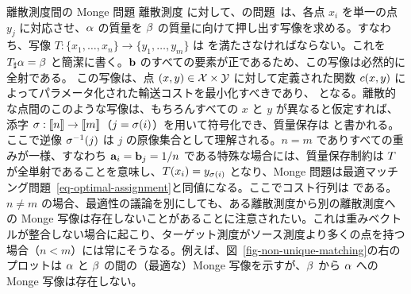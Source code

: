 \begin{rem1}{離散測度間の Monge 問題}\label{rem-monge1}
離散測度
に対して、\citeauthor{Monge1781}の問題~\citeyearpar{Monge1781}は、各点 $x_i$ を単一の点 $y_j$ に対応させ、$\alpha$ の質量を $\beta$ の質量に向けて押し出す写像を求める。すなわち、写像 $T:\{x_1,\dots, x_n\}\rightarrow \{y_1,\dots,y_m\}$ は
を満たさなければならない。これを $T_\sharp \alpha = \beta$ と簡潔に書く。$\mathrm{\textbf{b}}$ のすべての要素が正であるため、この写像は必然的に全射である。
%
この写像は、点 $(x,y) \in \mathcal{X} \times \mathcal{Y}$ に対して定義された関数 $c(x,y)$ によってパラメータ化された輸送コストを最小化すべきであり、
となる。離散的な点間のこのような写像は、もちろんすべての $x$ と $y$ が異なると仮定すれば、添字 $\sigma : \llbracket n\rrbracket \rightarrow \llbracket m\rrbracket$（$j=\sigma(i)$）を用いて符号化でき、質量保存は
と書かれる。ここで逆像 $\sigma^{-1}(j)$ は $j$ の原像集合として理解される。$n=m$ でありすべての重みが一様、すなわち $\mathrm{\textbf{a}}_i=\mathrm{\textbf{b}}_j=1/n$ である特殊な場合には、質量保存制約は $T$ が全単射であることを意味し、$T(x_i)=y_{\sigma(i)}$ となり、Monge 問題は最適マッチング問題~\eqref{eq-optimal-assignment}と同値になる。ここでコスト行列は
である。$n\ne m$ の場合、最適性の議論を別にしても、ある離散測度から別の離散測度への Monge 写像は存在しないことがあることに注意されたい。これは重みベクトルが整合しない場合に起こり、ターゲット測度がソース測度より多くの点を持つ場合（$n<m$）には常にそうなる。例えば、図~\ref{fig-non-unique-matching}の右のプロットは $\alpha$ と $\beta$ の間の（最適な）Monge 写像を示すが、$\beta$ から $\alpha$ への Monge 写像は存在しない。
\end{rem1}


